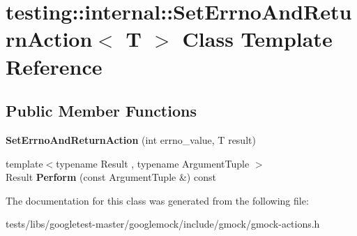 \hypertarget{classtesting_1_1internal_1_1SetErrnoAndReturnAction}{}\section{testing\+:\+:internal\+:\+:Set\+Errno\+And\+Return\+Action$<$ T $>$ Class Template Reference}
\label{classtesting_1_1internal_1_1SetErrnoAndReturnAction}
\subsection*{Public Member Functions}
\begin{DoxyCompactItemize}
\item 
\mbox{\label{classtesting_1_1internal_1_1SetErrnoAndReturnAction_abfe5a194a9b8f2b303c635ad99b3a257}} 
{\bfseries Set\+Errno\+And\+Return\+Action} (int errno\+\_\+value, T result)
\item 
\mbox{\label{classtesting_1_1internal_1_1SetErrnoAndReturnAction_a44025d0d124cab72878bf6bdb12c3693}} 
{\footnotesize template$<$typename Result , typename Argument\+Tuple $>$ }\\Result {\bfseries Perform} (const Argument\+Tuple \&) const
\end{DoxyCompactItemize}


The documentation for this class was generated from the following file\+:\begin{DoxyCompactItemize}
\item 
tests/libs/googletest-\/master/googlemock/include/gmock/gmock-\/actions.\+h\end{DoxyCompactItemize}
